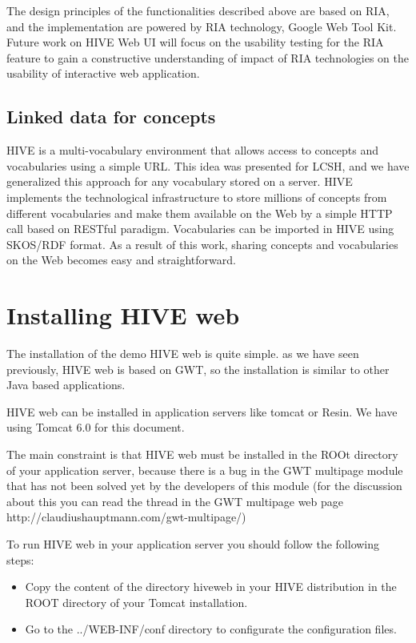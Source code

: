 The design principles of the functionalities described above are based on RIA, and the implementation are 
powered by RIA technology, Google Web Tool Kit. Future work on HIVE Web UI will focus on the usability 
testing for the RIA feature to gain a constructive understanding of impact of RIA technologies on the 
usability of interactive web application.

\subsection{Linked data for concepts}

HIVE is a multi-vocabulary environment that allows access to concepts and vocabularies using a simple 
URL.  This idea was presented for LCSH, and 
we have generalized this approach for any vocabulary stored on a server.  HIVE implements the 
technological infrastructure to store millions of concepts from different vocabularies and make them 
available on the Web by a simple HTTP call based on RESTful paradigm.  Vocabularies can be imported in HIVE using SKOS/RDF format. 
As a result of this work, sharing concepts and vocabularies on the Web becomes easy and straightforward.

\section{Installing HIVE web}

The installation of the demo HIVE web is quite simple. as we have seen previously, HIVE web is based on GWT, so the installation is similar 
to other Java based applications.

HIVE web can be installed in application servers like tomcat or Resin. We have using Tomcat 6.0 for this document.

The main constraint is that HIVE web must be installed in the ROOt directory of your application server, because there is a bug in the GWT 
multipage module that has not been solved yet by the developers of this module (for the discussion about this you can read the thread in 
the GWT multipage web page http://claudiushauptmann.com/gwt-multipage/)

To run HIVE web in your application server you should follow the following steps:

\begin{itemize}
 \item Copy the content of the directory hiveweb in your HIVE distribution in the ROOT directory of your Tomcat installation.
 \item Go to the  ../WEB-INF/conf directory to configurate the configuration files.
\end{itemize}

